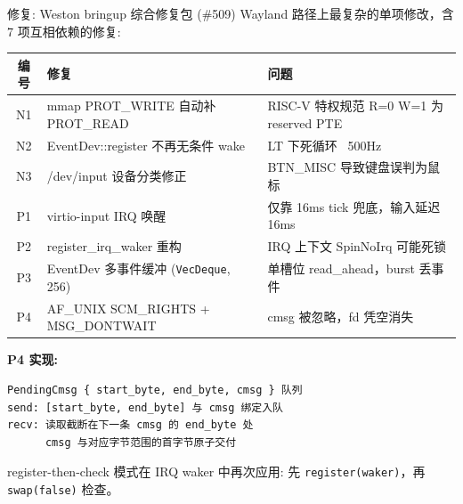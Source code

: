 \documentclass[aspectratio=169,10pt]{ctexbeamer}
\newcommand{\code}[1]{\texttt{#1}}
\newcommand{\highlight}[1]{\textcolor{accent}{#1}}
\begin{document}

\begin{frame}[fragile,shrink=10]{修复: Weston bringup 综合修复包 (\#509)}
Wayland 路径上最复杂的单项修改，含 7 项互相依赖的修复:

\vspace{1mm}
\small
\begin{tabularx}{\textwidth}{c p{3cm} X}
\toprule
\textbf{编号} & \textbf{修复} & \textbf{问题} \\
\midrule
N1 & mmap PROT\_WRITE 自动补 PROT\_READ & RISC-V 特权规范 R=0 W=1 为 reserved PTE \\
N2 & EventDev::register 不再无条件 wake & LT 下死循环 ~500Hz \\
N3 & /dev/input 设备分类修正 & BTN\_MISC 导致键盘误判为鼠标 \\
P1 & virtio-input IRQ 唤醒 & 仅靠 16ms tick 兜底，输入延迟 16ms \\
P2 & register\_irq\_waker 重构 & IRQ 上下文 SpinNoIrq 可能死锁 \\
P3 & EventDev 多事件缓冲 (\texttt{VecDeque}, 256) & 单槽位 read\_ahead，burst 丢事件 \\
P4 & AF\_UNIX SCM\_RIGHTS + MSG\_DONTWAIT & cmsg 被忽略，fd 凭空消失 \\
\bottomrule
\end{tabularx}

\vspace{1mm}
\textbf{P4 实现:}

\begin{verbatim}
PendingCmsg { start_byte, end_byte, cmsg } 队列
send: [start_byte, end_byte] 与 cmsg 绑定入队
recv: 读取截断在下一条 cmsg 的 end_byte 处
      cmsg 与对应字节范围的首字节原子交付
\end{verbatim}

\highlight{register-then-check} 模式在 IRQ waker 中再次应用:
先 \code{register(waker)}，再 \code{swap(false)} 检查。
\end{frame}

\end{document}
